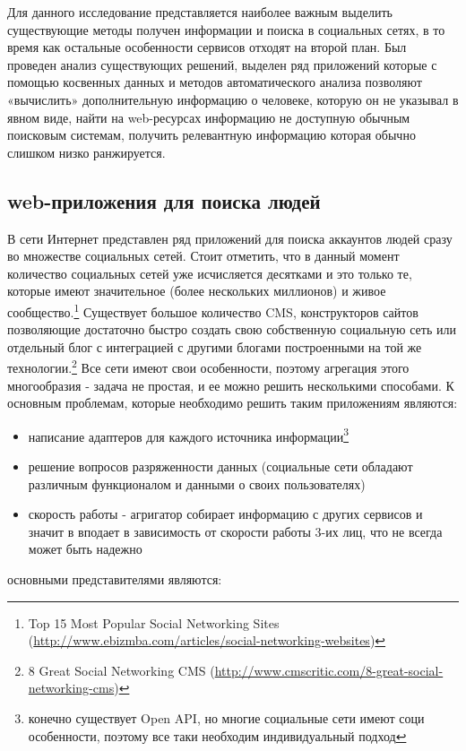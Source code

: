 \begin{chap1}
Для данного исследование представляется наиболее важным выделить существующие методы получен информации и поиска в социальных сетях, в то время как остальные особенности сервисов отходят на второй план. Был проведен анализ существующих решений, выделен ряд приложений которые с помощью косвенных данных и методов автоматического анализа позволяют «вычислить» дополнительную информацию о человеке, которую он не указывал в явном виде, найти на web-ресурсах информацию не доступную обычным поисковым системам, получить релевантную информацию которая обычно слишком низко ранжируется. %

\subsection{web-приложения для поиска людей}
В сети Интернет представлен ряд приложений для поиска аккаунтов людей сразу во множестве социальных сетей. Стоит отметить, что в данный момент количество социальных сетей уже исчисляется десятками и это только те, которые имеют значительное (более нескольких миллионов) и живое сообщество.\footnote{Top 15 Most Popular Social Networking Sites (\url{http://www.ebizmba.com/articles/social-networking-websites})}
 Существует большое количество CMS,%
конструкторов сайтов позволяющие достаточно быстро создать свою собственную социальную сеть или отдельный блог с интеграцией с другими блогами построенными на той же технологии.\footnote{8 Great Social Networking CMS (\url{http://www.cmscritic.com/8-great-social-networking-cms})} 
Все сети имеют свои особенности,  поэтому агрегация этого многообразия - задача не простая, и ее можно решить несколькими способами. К основным проблемам, которые необходимо решить таким приложениям являются:
\begin{itemize}
\item написание адаптеров для каждого источника информации\footnote{конечно существует Open API, но многие социальные сети имеют соци особенности, поэтому все таки необходим индивидуальный подход}
\item решение вопросов разряженности данных (социальные сети обладают различным функционалом и данными о своих пользователях)
\item скорость работы - агригатор собирает информацию с других сервисов и значит в вподает в зависимость от скорости работы 3-их лиц, что не всегда может быть надежно
\end{itemize}
основными представителями являются:
\begin{itemize}


\end{itemize}
\end{chap1}
